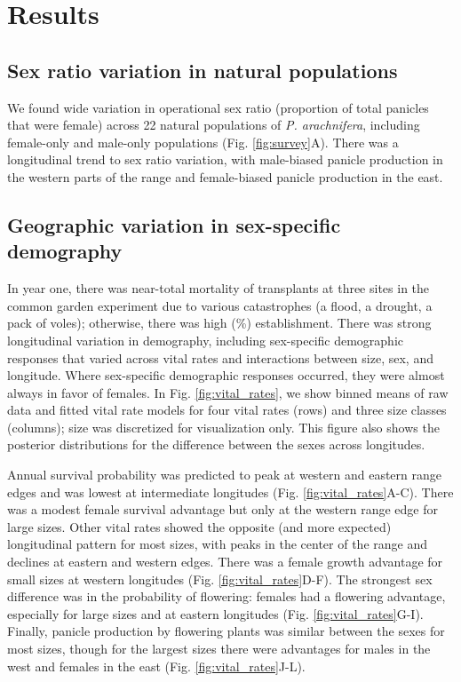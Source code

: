 \documentclass[11pt]{article}\usepackage[]{graphicx}\usepackage[]{color}
\newcommand{\revise}[1]{{\color{Black}{#1}}}
\begin{document}
\section*{Results}

\subsection*{Sex ratio variation in natural populations}
We found wide variation in operational sex ratio (proportion of total panicles that were female) across 22 natural populations of \textit{P. arachnifera}, including female-only and male-only populations (Fig. \ref{fig:survey}A). 
There was a longitudinal trend to sex ratio variation, with male-biased panicle production in the \revise{xeric} western parts of the range and female-biased panicle production in the \revise{mesic} east. 

\subsection*{Geographic variation in sex-specific demography}
In year one, there was near-total mortality of transplants at three sites in the common garden experiment due to various catastrophes (a flood, a drought, a pack of voles); otherwise, there was high (\%) establishment. 
There was strong longitudinal variation in demography, including sex-specific demographic responses that varied across vital rates and interactions between size, sex, and longitude. 
Where sex-specific demographic responses occurred, they were almost always in favor of females. 
In Fig. \ref{fig:vital_rates}, we show binned means of raw data and fitted vital rate models for four vital rates (rows) and three size classes (columns); size was discretized for visualization only. 
This figure also shows the posterior distributions for the difference between the sexes across longitudes. 

Annual survival probability was predicted to peak at western and eastern range edges and was lowest at intermediate longitudes (Fig. \ref{fig:vital_rates}A-C). 
There was a modest female survival advantage but only at the western range edge for large sizes. 
Other vital rates showed the opposite (and more expected) longitudinal pattern for most sizes, with peaks in the center of the range and declines at eastern and western edges. 
There was a female growth advantage for small sizes at western longitudes (Fig. \ref{fig:vital_rates}D-F).
The strongest sex difference was in the probability of flowering: females had a flowering advantage, especially for large sizes and at eastern longitudes (Fig. \ref{fig:vital_rates}G-I). 
Finally, panicle production by flowering plants was similar between the sexes for most sizes, though for the largest sizes there were advantages for males in the west and females in the east (Fig. \ref{fig:vital_rates}J-L). 
\end{document}
